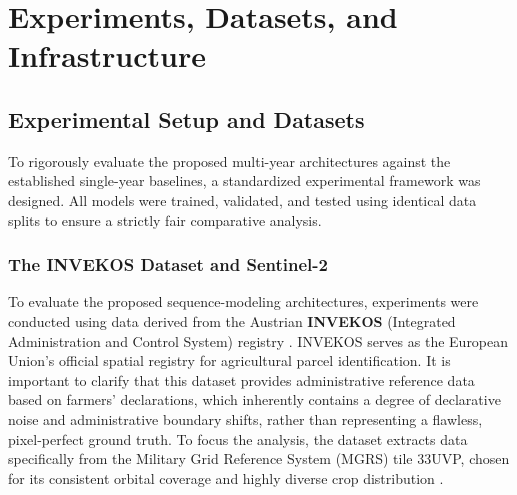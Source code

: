 \chapter{Experiments, Datasets, and Infrastructure}
\label{cha:experiments}


\section{Experimental Setup and Datasets}
\label{sec:experimental_setup}

To rigorously evaluate the proposed multi-year architectures against the established single-year baselines,
a standardized experimental framework was designed. All models were trained, validated,
and tested using identical data splits to ensure a strictly fair comparative analysis.

\subsection{The INVEKOS Dataset and Sentinel-2}
\label{subsec:invekos_sentinel2}

To evaluate the proposed sequence-modeling architectures, experiments were conducted using data
derived from the Austrian \textbf{INVEKOS} (Integrated Administration and Control System) registry \cite{invekos_austria}.
INVEKOS serves as the European Union's official spatial registry for agricultural parcel identification.
It is important to clarify that this dataset provides administrative reference data based on farmers' declarations,
which inherently contains a degree of declarative noise and administrative boundary shifts,
rather than representing a flawless, pixel-perfect ground truth.
To focus the analysis, the dataset extracts data specifically from the Military Grid Reference System (MGRS) tile 33UVP,
chosen for its consistent orbital coverage and highly diverse crop distribution \cite{perantoni_bayesian_2024}.

